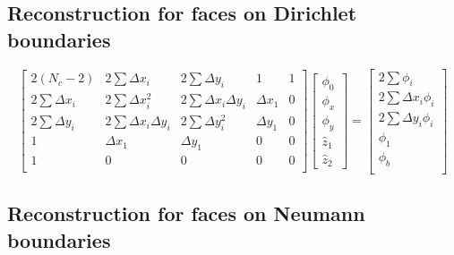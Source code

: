 \documentclass[final,3p,review]{elsarticle}
\begin{document}
	\subsection{Reconstruction for faces on Dirichlet boundaries}
	
	\begin{equation}
		\begin{bmatrix}
			2(N_c-2) & 2\sum \Delta x_i & 2\sum \Delta y_i & 1 & 1\\
			2\sum \Delta x_i & 2\sum \Delta x_i^2 & 2\sum \Delta x_i \Delta y_i & \Delta x_1 & 0 \\
			2\sum \Delta y_i & 2\sum \Delta x_i \Delta y_i & 2\sum \Delta y_i^2 & \Delta y_1 & 0 \\
			1 & \Delta x_1 & \Delta y_1 & 0 & 0 \\
			1 & 0 & 0 & 0 & 0 \\
		\end{bmatrix}
		\begin{bmatrix}
			\phi_0 \\
			\phi_x \\
			\phi_y \\
			\hat{z}_1 \\ 
			\hat{z}_2
		\end{bmatrix}	
		= 
		\begin{bmatrix}
			2\sum \phi_i \\
			2\sum \Delta x_i \phi_i  \\ 
			2\sum \Delta y_i \phi_i \\
			\phi_1 \\
			\phi_b \\ 
		\end{bmatrix}	
	\end{equation} 
	
	\subsection{Reconstruction for faces on Neumann boundaries}
	
\end{document}
